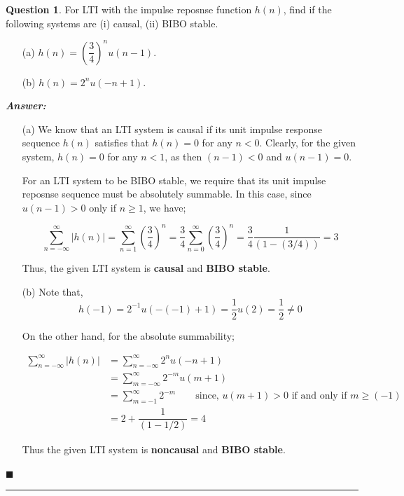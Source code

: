 \documentclass[12pt]{article}
\theoremstyle{definition}
\newtheorem{question}{Question}
\newenvironment{answer}{
    \textbf{\textit{Answer:}} \qquad
}{\hfill $\blacksquare$ \\ \begin{center}
    \rule{0.6\linewidth}{0.5px}    
\end{center}
}
\begin{document}
\begin{question}
    For LTI with the impulse reposnse function $h(n)$, find if the following systems are (i) causal, (ii) BIBO stable.
    \begin{enumerate}
        \item[(a)] $h(n) = \left(\dfrac{3}{4}\right)^n u(n-1)$.
        \item[(b)] $h(n) = 2^n u(-n + 1)$. 
    \end{enumerate}
\end{question}

\begin{answer}
    \begin{enumerate}
        \item[(a)] We know that an LTI system is causal if its unit impulse response sequence $h(n)$ satisfies that $h(n) = 0$ for any $n < 0$. Clearly, for the given system, $h(n) = 0$ for any $n < 1$, as then $(n-1) < 0$ and $u(n-1) = 0$. 
        
        For an LTI system to be BIBO stable, we require that its unit impulse reposnse sequence must be absolutely summable. In this case, since $u(n-1) > 0$ only if $n \geq 1$, we have;

        $$
        \sum_{n = -\infty}^{\infty} \vert h(n) \vert = \sum_{n = 1}^{\infty} \left(\dfrac{3}{4}\right)^n = \dfrac{3}{4} \sum_{n = 0}^{\infty} \left(\dfrac{3}{4}\right)^n = \dfrac{3}{4} \dfrac{1}{(1 - (3/4))} = 3
        $$

        Thus, the given LTI system is \textbf{causal} and \textbf{BIBO stable}.
        \item[(b)] Note that, 
        $$h(-1) = 2^{-1} u(-(-1) + 1) = \dfrac{1}{2} u(2) = \dfrac{1}{2} \neq 0$$   

        On the other hand, for the absolute summability;

        \begin{align*}
            \sum_{n = -\infty}^{\infty} \vert h(n) \vert 
            & = \sum_{n = -\infty}^{\infty} 2^n u(-n + 1)\\
            & = \sum_{m = -\infty}^{\infty} 2^{-m} u(m + 1)\\
            & = \sum_{m = -1}^{\infty} 2^{-m} \qquad \text{since, } u(m + 1) > 0 \text{ if and only if } m \geq (-1)\\
            & = 2 + \dfrac{1}{(1 - 1/2)} = 4 
        \end{align*}

        Thus the given LTI system is \textbf{noncausal} and \textbf{BIBO stable}.
    \end{enumerate}
\end{answer}
\end{document}

